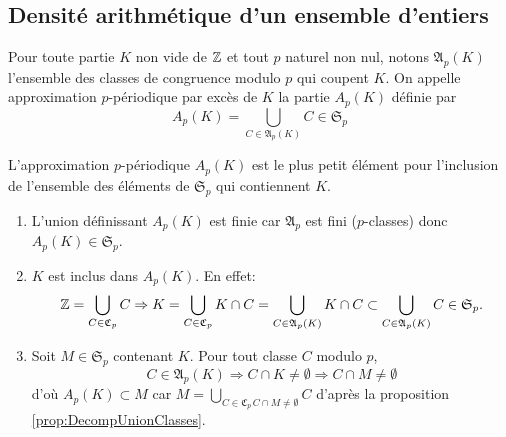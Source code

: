 \subsection{Densité arithmétique d'un ensemble d'entiers} \label{SubSec:DensitArith}
\begin{defi} Pour toute partie $K$ non vide de $\mathbb{Z}$ et tout $p$ naturel non nul, notons $\mathfrak{A}_p(K)$ l'ensemble des classes de congruence modulo $p$ qui coupent $K$. On appelle approximation $p$-périodique par excès de $K$ la partie $A_p(K)$ définie par
\begin{displaymath}
 A_p(K) = \bigcup_{C \in \mathfrak{A}_p(K)} C \in \mathfrak{S}_p
\end{displaymath}
\end{defi}
\begin{propn}
 L'approximation $p$-périodique $A_p(K)$ est le plus petit élément pour l'inclusion de l'ensemble des éléments de $\mathfrak{S}_p$ qui contiennent $K$.
\end{propn}
\begin{demo}
  \begin{enumerate}
   \item L'union définissant $A_p(K)$ est finie car $\mathfrak{A}_p$ est fini ($p$-classes) donc $A_p(K) \in \mathfrak{S}_p$.
   \item $K$ est inclus dans $A_p(K)$. En effet:
 \begin{displaymath}
  \mathbb{Z} = \bigcup_{C \in \mathfrak{C}_p} C \Rightarrow K = \bigcup_{C \in \mathfrak{C}_p} K\cap C
  = \bigcup_{C \in \mathfrak{A}_p(K)} K\cap C \subset \bigcup_{C \in \mathfrak{A}_p(K)} C \in \mathfrak{S}_p.
 \end{displaymath}
   \item Soit $M \in \mathfrak{S}_p$ contenant $K$. Pour tout classe $C$ modulo $p$,
\begin{displaymath}
 C \in \mathfrak{A}_p(K) \Rightarrow C\cap K \neq \emptyset \Rightarrow C\cap M \neq \emptyset
\end{displaymath}
d'où $A_p(K) \subset M$ car $M = \bigcup_{C\in \mathfrak{C}_p \, C\cap M \neq \emptyset}C$  d'après la proposition \ref{prop:DecompUnionClasses}.
  \end{enumerate}
\end{demo}

